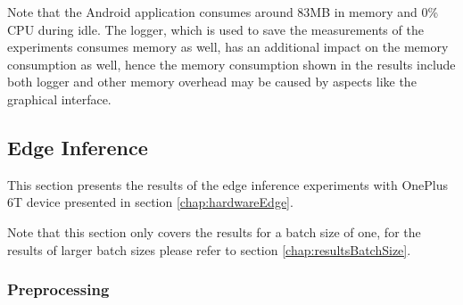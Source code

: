 Note that the Android application consumes around 83MB in memory and 0\% CPU during idle. The logger, which is used to save the measurements of the experiments consumes memory as well, has an additional impact on the memory consumption as well, hence the memory consumption shown in the results include both logger and other memory overhead may be caused by aspects like the graphical interface.


\subsection{Edge Inference}
\label{chap:EdgeResults}
This section presents the results of the edge inference experiments with OnePlus 6T device presented in section \ref{chap:hardwareEdge}.

Note that this section only covers the results for a batch size of one, for the results of larger batch sizes please refer to section \ref{chap:resultsBatchSize}.

\FloatBarrier
\subsubsection{Preprocessing}
\label{chap:edgePrepro}


